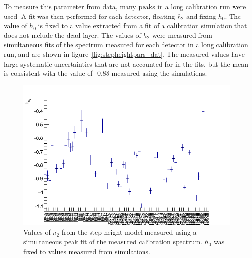 \documentclass[/main.tex]{subfiles}
\begin{document}
To measure this parameter from data, many peaks in a long calibration run were used.
A fit was then performed for each detector, floating $h_2$ and fixing $h_{0}$.
The value of $h_0$ is fixed to a value extracted from a fit of a calibration simulation that does not include the dead layer.
The values of $h_2$ were measured from simultaneous fits of the spectrum measured for each detector in a long calibration run, and are shown in figure~\ref{fig:stepheightpars_dat}.
The measured values have large systematic uncertainties that are not accounted for in the fits, but the mean is consistent with the value of -0.88 measured using the simulations.
\begin{figure}[h]
  \centering
  \includegraphics[width=\textwidth]{hs2}
  \caption[Measured values of $h_2$ in calibration data] {\label{fig:stepheightpars_sim}
    Values of $h_2$ from the step height model measured using a simultaneous peak fit of the measured  calibration spectrum. $h_0$ was fixed to values measured from simulations.
  }
\end{figure}
\end{document}

